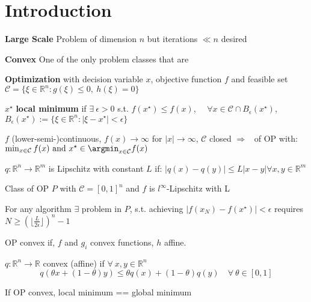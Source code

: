 \section{Introduction}


\textbf{Large Scale}
Problem of dimension $n$ but iterations $\ll n$ desired

\textbf{Convex}
One of the only problem classes that are 

\textbf{Optimization}
with decision variable $x$, objective function $f$ and
feasible set $\mathcal{C} = \{\xi \in \mathbb{R}^{n}: g(\xi)\le0,\ h(\xi)=0\}$

$x^\star$ \textbf{local minimum} if $\exists\ \epsilon > 0$ s.t.
$f(x^\star)\leq f(x)$, $\quad \forall x \in \mathcal{C} \cap B_\epsilon(x^\star)$,
$B_\epsilon(x^\star):=\{\xi\in\mathbb{R}^{n}:|\xi-x^\star|<\epsilon\}$


\begin{proposition}
	$f$ (lower-semi-)continuous,
	$f(x)\rightarrow\infty$
	for $|x|\rightarrow\infty$,
	$\mathcal{C}$ closed
	$\Rightarrow$ \exists\ of OP with:
	$\min_{x \in \mathcal{C}} f(x)\ \text{and}\ x^\star\in\argmin_{x \in \mathcal{C}}f(x)$
\end{proposition}


\begin{definition}
	$q: \mathbb{R}^{n} \rightarrow \mathbb{R}^{m}$
	is Lipschitz with constant $L$ if:
	$|q(x)-q(y)| \le L |x-y| \forall x,y \in \mathbb{R}^{m}$
\end{definition}

Class of OP $P$ with $\mathcal{C}=[0,1]^n$
and $f$ is $l^\infty$-Lipschitz with L

\begin{proposition}
	For any algorithm $\exists$ problem in $P$,
	s.t. achieving $|f(x_N )−f(x^⋆)| < \epsilon$
	requires
	$N \ge (\lfloor\frac{L}{2\epsilon}\rfloor)^n-1$
\end{proposition}

\begin{definition}
	OP convex if, $f$ and $g_i$ convex functions, $h$ affine.
\end{definition}


\begin{definition}
	$q:\mathbb{R}^{n}\rightarrow\mathbb{R}$
	convex (affine) if $\forall\ x, y \in \mathbb{R}^{n}$
	\vspace{-2mm}
	$$q(\theta x+(1−\theta)y)\le\theta q(x)+(1−\theta)q(y)\quad\forall\ \theta \in [0, 1]$$
\end{definition}
\vspace{-1mm}
\begin{proposition}
	If OP convex, local minimum == global minimum
\end{proposition}
